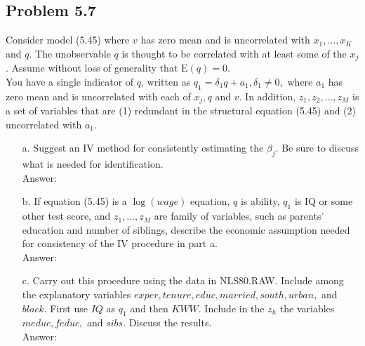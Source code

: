 \documentclass[10pt]{article}
\newcommand{\E}{\text{E}}
\begin{document}
\subsection*{Problem 5.7}
Consider model (5.45) where $v$ has zero mean and is uncorrelated with $x_1,\ldots,x_K$ and $q$. The unobservable $q$ is thought to be correlated with at least some of the $x_j$. Assume without loss of generality that $\E(q)=0.$\\
You have a single indicator of $q$, written as $q_1=\delta_1q+a_1,\delta_1\neq 0,$ where $a_1$ has zero mean and is uncorrelated with each of $x_j,q$ and $v$. In addition, $z_1,z_2,\ldots,z_M$ is a set of variables that are (1) redundant in the structural equation (5.45) and (2) uncorrelated with $a_1.$
\begin{enumerate}
\item[a.] Suggest an IV method for consistently estimating the $\beta_j.$ Be sure to discuss what is needed for identification.
\\ Answer:\\

\item[b.] If equation (5.45) is a $\log(wage)$ equation, $q$ is ability, $q_1$ is IQ or some other test score, and $z_1,\ldots,z_M$ are family of variables, such as parents' education and number of siblings, describe the economic assumption needed for consistency of the IV procedure in part a.
\\ Answer:\\

\item[c.] Carry out this procedure using the data in NLS80.RAW. Include among the explanatory variables $exper, tenure,educ,married,south,urban,$ and $black$. First use $IQ$ as $q_1$ and then $KWW$. Include in the $z_h$ the variables $meduc,feduc,$ and $sibs.$ Discuss the results.
\\ Answer:\\
\end{enumerate}
\end{document}
